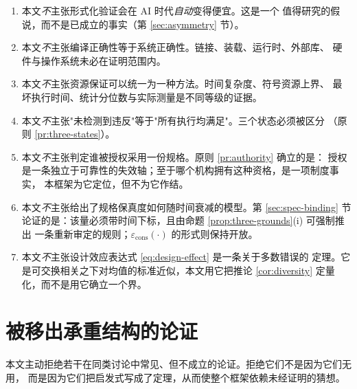 \begin{enumerate}[label=(N\arabic*)]
      （原则 \ref{pr:crosscutting}）。
\item 本文\emph{不}主张形式化验证会在 AI 时代\emph{自动}变得便宜。这是一个
      值得研究的假说，而不是已成立的事实（第 \ref{sec:asymmetry} 节）。
\item 本文\emph{不}主张编译正确性等于系统正确性。链接、装载、运行时、外部库、
      硬件与操作系统未必在证明范围内。
\item 本文\emph{不}主张资源保证可以统一为一种方法。时间复杂度、符号资源上界、
      最坏执行时间、统计分位数与实际测量是不同等级的证据。
\item 本文\emph{不}主张"未检测到违反"等于"所有执行均满足"。三个状态必须被区分
      （原则 \ref{pr:three-states}）。
\item 本文\emph{不}主张判定谁被授权采用一份规格。原则 \ref{pr:authority} 确立的是：
      授权是一条独立于可靠性的失效轴；至于哪个机构拥有这种资格，是一项制度事实，
      本框架为它定位，但不为它作结。
\item 本文\emph{不}主张给出了规格保真度如何随时间衰减的模型。第 \ref{sec:spec-binding}
      节论证的是：该量必须带时间下标，且由命题 \ref{prop:three-grounds}(i) 可强制推出
      一条重新审定的规则；$\varepsilon_{\text{cons}}(\cdot)$ 的形式则保持开放。
\item 本文\emph{不}主张设计效应表达式 \eqref{eq:design-effect} 是一条关于多数错误的
      定理。它是可交换相关之下对均值的标准近似，本文用它把推论 \ref{cor:diversity}
      定量化，而不是用它确立一个界。
\end{enumerate}

\section{被移出承重结构的论证}

本文主动拒绝若干在同类讨论中常见、但不成立的论证。拒绝它们不是因为它们无用，
而是因为它们把启发式写成了定理，从而使整个框架依赖未经证明的猜想。

